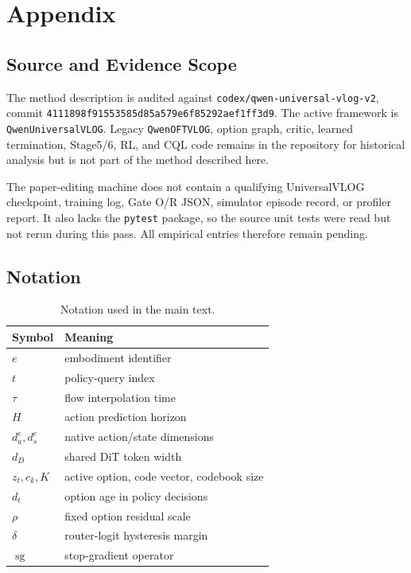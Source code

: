 \section{Appendix}

\subsection{Source and Evidence Scope}

The method description is audited against
\texttt{codex/qwen-universal-vlog-v2}, commit
\texttt{4111898f91553585d85a579e6f85292aef1ff3d9}.  The active framework is
\texttt{QwenUniversalVLOG}.  Legacy \texttt{QwenOFTVLOG}, option graph, critic,
learned termination, Stage5/6, RL, and CQL code remains in the repository for
historical analysis but is not part of the method described here.

The paper-editing machine does not contain a qualifying UniversalVLOG
checkpoint, training log, Gate O/R JSON, simulator episode record, or profiler
report.  It also lacks the \texttt{pytest} package, so the source unit tests were
read but not rerun during this pass.  All empirical entries therefore remain
pending.

\subsection{Notation}

\begin{table}[h]
\centering
\scriptsize
\setlength{\tabcolsep}{3pt}
\begin{tabular}{ll}
\toprule
Symbol & Meaning \\
\midrule
\(e\) & embodiment identifier \\
\(t\) & policy-query index \\
\(\tau\) & flow interpolation time \\
\(H\) & action prediction horizon \\
\(d_a^e,d_s^e\) & native action/state dimensions \\
\(d_D\) & shared DiT token width \\
\(z_t,c_k,K\) & active option, code vector, codebook size \\
\(d_t\) & option age in policy decisions \\
\(\rho\) & fixed option residual scale \\
\(\delta\) & router-logit hysteresis margin \\
\(\operatorname{sg}\) & stop-gradient operator \\
\bottomrule
\end{tabular}
\caption{Notation used in the main text.}
\label{tab:notation}
\end{table}

